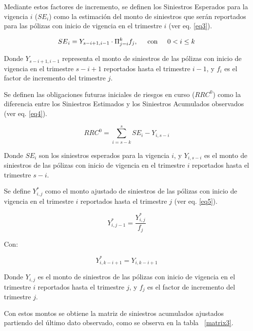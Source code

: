 \documentclass[11pt,twoside,openright,spanish]{report}
\numberwithin{equation}{chapter}
\numberwithin{figure}{chapter}
\numberwithin{table}{chapter}
\begin{document}
	Mediante estos factores de incremento, se definen los Siniestros Esperados para la vigencia $i$ (${SE}_{i}$) como la estimación del monto de siniestros que serán reportados para las pólizas con inicio de vigencia en el trimestre $i$ (ver eq. \ref{eq3}).
	
	\begin{equation}
	{SE}_{i}={Y}_{s-i+1,i-1}\cdot\Pi_{j=i}^{k}{f}_{j},\hspace{0.5cm}\text{con}\hspace{0.5cm}0< i\le k
		\label{eq3}
	\end{equation}

	Donde ${Y}_{s-i+1,i-1}$ representa el monto de siniestros de las pólizas con inicio de vigencia en el trimestre $s-i+1$ reportados hasta el trimestre $i-1$, y ${f}_{i}$ es el factor de incremento del trimestre $j$. 

	Se definen las obligaciones futuras iniciales de riesgos en curso (${RRC}^{0}$) como la diferencia entre los Siniestros Estimados y los Siniestros Acumulados observados (ver eq. \ref{eq4}).
	
	\begin{equation}
	{RRC}^{0}=\sum _{i=s-k}^{s}{SE}_{i}-{Y}_{i,s-i}
	\label{eq4}
	\end{equation}

	Donde ${SE}_{i}$ son los siniestros esperados para la vigencia $i$, y ${Y}_{i,s-i}$ es el monto de siniestros de las pólizas con inicio de vigencia en el trimestre $i$ reportados hasta el trimestre $s-i$.
		 
	Se define ${Y}_{i,j}^{*}$ como el monto ajustado de siniestros de las pólizas con inicio de vigencia en el trimestre $i$ reportados hasta el trimestre $j$ (ver eq. \ref{eq5}).
	
		\begin{equation}
	{Y}_{i,j-1}^{*}=\frac{{Y}_{i,j}^{*}}{{f}_{j}}
	\label{eq5}
	\end{equation}

	Con:

	$${Y}_{i,k-i+1}^{*}={Y}_{i,k-i+1}$$	

	Donde ${Y}_{i,j}$ es el monto de siniestros de las pólizas con inicio de vigencia en el trimestre $i$ reportados hasta el trimestre $j$, y ${f}_{j}$ es el factor de incremento del trimestre $j$.

	Con estos montos se obtiene la matriz de siniestros acumulados ajustados partiendo del último dato observado, como se observa en la tabla ~\ref{matrix3}.
		
\end{document}
